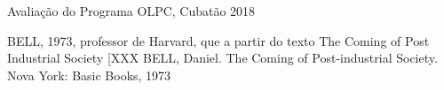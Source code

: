 \documentclass[
12pt,		%
openright,	%
twoside,  %
a4paper,			%
chapter=TITLE,		%
english,			%
french,				%
spanish,			%
brazil				%
]{USPSC-classe/USPSC}
\begin{document}
\begin{flushleft}
\begin{flushleft}
\begin{flushleft}
\begin{flushleft}
\begin{flushleft}
\begin{flushleft}
\begin{flushleft}
\begin{flushleft}
\begin{flushleft}
\begin{flushleft}
 Avalia\c{c}\~ao do Programa OLPC, Cubat\~ao 2018
\end{flushleft}


\end{flushleft}


\end{flushleft}


\end{flushleft}


\end{flushleft}


\end{flushleft}


\end{flushleft}


\end{flushleft}


\end{flushleft}


\end{flushleft}


\begin{flushleft}
\begin{flushleft}
\begin{flushleft}
\begin{flushleft}
\begin{flushleft}
\begin{flushleft}
\begin{flushleft}
\begin{flushleft}
\begin{flushleft}
\begin{flushleft}
[BELL, 1973]  BELL, 1973, professor de Harvard, que a partir do texto The Coming of Post Industrial Society [XXX BELL, Daniel. The Coming of Post-industrial Society. Nova York: Basic Books, 1973
\end{flushleft}


\end{flushleft}


\end{flushleft}


\end{flushleft}


\end{flushleft}


\end{flushleft}


\end{flushleft}


\end{flushleft}


\end{flushleft}


\end{flushleft}
\end{document}
